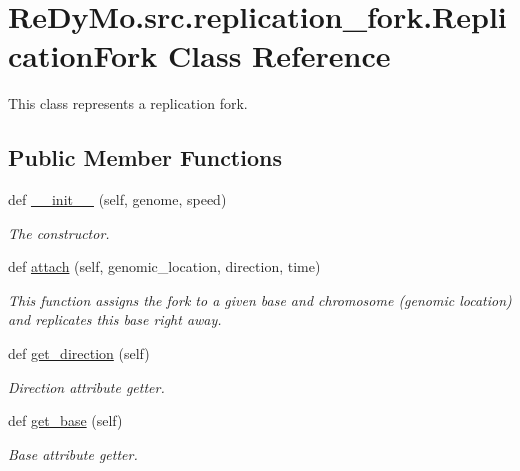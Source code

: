 \hypertarget{classReDyMo_1_1src_1_1replication__fork_1_1ReplicationFork}{}\section{Re\+Dy\+Mo.\+src.\+replication\+\_\+fork.\+Replication\+Fork Class Reference}
\label{classReDyMo_1_1src_1_1replication__fork_1_1ReplicationFork}


This class represents a replication fork.  


\subsection*{Public Member Functions}
\begin{DoxyCompactItemize}
\item 
def \mbox{\hyperlink{classReDyMo_1_1src_1_1replication__fork_1_1ReplicationFork_a33deb5c1f40c77b4c2d0ad873865ae20}{\+\_\+\+\_\+init\+\_\+\+\_\+}} (self, genome, speed)
\begin{DoxyCompactList}\small\item\em The constructor. \end{DoxyCompactList}\item 
def \mbox{\hyperlink{classReDyMo_1_1src_1_1replication__fork_1_1ReplicationFork_a616af5a3e5cb32dfad3023df09dffee2}{attach}} (self, genomic\+\_\+location, direction, time)
\begin{DoxyCompactList}\small\item\em This function assigns the fork to a given base and chromosome (genomic location) and replicates this base right away. \end{DoxyCompactList}\item 
def \mbox{\hyperlink{classReDyMo_1_1src_1_1replication__fork_1_1ReplicationFork_a8c78154d928c20a98cc1487aabab027a}{get\+\_\+direction}} (self)
\begin{DoxyCompactList}\small\item\em Direction attribute getter. \end{DoxyCompactList}\item 
def \mbox{\hyperlink{classReDyMo_1_1src_1_1replication__fork_1_1ReplicationFork_af49d73c45344c7ede5b77002d343d8d7}{get\+\_\+base}} (self)
\begin{DoxyCompactList}\small\item\em Base attribute getter. \end{DoxyCompactList}\item 

\end{DoxyCompactItemize}
